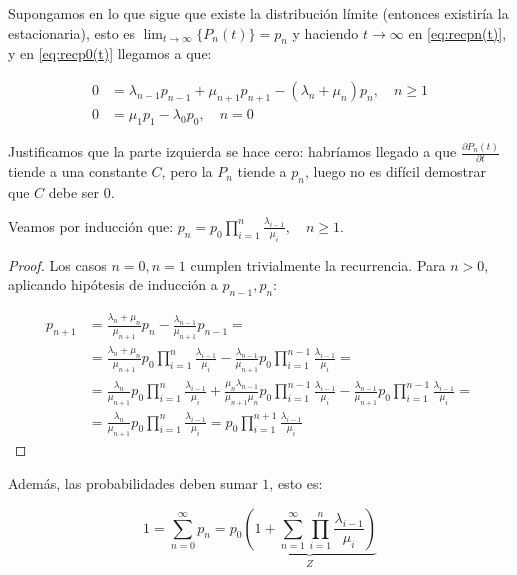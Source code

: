 \documentclass[a4paper,10pt]{scrartcl}
\theoremstyle{definition}
\numberwithin{equation}{section}
\begin{document}
Supongamos en lo que sigue que existe la distribución límite (entonces existiría la estacionaria), esto es 
$\lim_{t\rightarrow \infty}\{P_n(t)\} = p_n$ y haciendo $t\rightarrow \infty$ en \eqref{eq:recpn(t)},
y en \eqref{eq:recp0(t)} llegamos a que:

\begin{align*}
0 &= \lambda_{n-1} p_{n-1} + \mu_{n+1} p_{n+1} - (\lambda_n + \mu_n) p_n, \quad n\ge 1\\
0 &= \mu_1 p_1 -\lambda_0 p_0, \quad n=0
\end{align*}

Justificamos que la parte izquierda se hace cero: habríamos llegado a que $\frac{\partial P_n(t)}{\partial t}$ tiende a una constante $C$,
pero la $P_n$ tiende a $p_n$, luego no es difícil demostrar que $C$ debe ser 0.

Veamos por inducción que: $p_n = p_0 \prod_{i=1}^n \frac{\lambda_{i-1}}{\mu_i}, \quad n\ge 1 \label{p_n=p_0*}$.

\begin{proof}
 Los casos $n=0, n=1$ cumplen trivialmente la recurrencia. Para $n>0$, aplicando hipótesis de inducción a $p_{n-1}, p_{n}$:
 
 \begin{align*}
 p_{n+1} &= \frac{\lambda_n + \mu_n}{\mu_{n+1}} p_n - \frac{\lambda_{n-1}}{\mu_{n+1}}p_{n-1} = \\
         &= \frac{\lambda_n + \mu_n}{\mu_{n+1}} p_0 \prod_{i=1}^n \frac{\lambda_{i-1}}{\mu_i} - 
            \frac{\lambda_{n-1}}{\mu_{n+1}} p_0 \prod_{i=1}^{n-1} \frac{\lambda_{i-1}}{\mu_i} = \\
         &= \frac{\lambda_n}{\mu_{n+1}} p_0 \prod_{i=1}^n \frac{\lambda_{i-1}}{\mu_i} + 
            \frac{\mu_n \lambda_{n-1}}{\mu_{n+1}\mu_n} p_0 \prod_{i=1}^{n-1} \frac{\lambda_{i-1}}{\mu_i} - 
            \frac{\lambda_{n-1}}{\mu_{n+1}} p_0 \prod_{i=1}^{n-1} \frac{\lambda_{i-1}}{\mu_i} = \\
         &= \frac{\lambda_n}{\mu_{n+1}} p_0 \prod_{i=1}^n \frac{\lambda_{i-1}}{\mu_i} = p_0 \prod_{i=1}^{n+1} \frac{\lambda_{i-1}}{\mu_i}
 \end{align*}
\end{proof}

Además, las probabilidades deben sumar $1$, esto es:

\begin{equation}
1 = \sum_{n=0}^{\infty} p_n = p_0 \underbrace{\left(1 + \sum_{n=1}^{\infty} \prod_{i=1}^n \frac{\lambda_{i-1}}{\mu_i} \right)}_{Z}
\label{eq:stabseries}
\end{equation}
\end{document}
